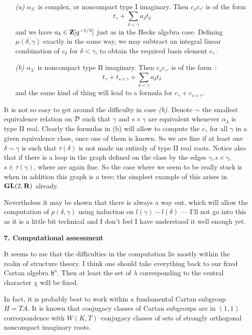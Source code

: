 \documentclass[11 pt]{article}
\def\a{\alpha}
\def\D{{\cal D}}
\def\d{\delta}
\def\GL{{\bf GL}}
\def\g{\gamma}
\def\hf{{\mathfrak h}}
\def\l{\lambda}
\def\qmh{q^{-1/2}}
\def\R{{\bf R}}
\def\Z{{\bf Z}}
\begin{document}
\begin{itemize}
\item[\it(a)]$\a_{\l'}$ is complex, or noncompact type I imaginary. Then
$c_sc_{\g'}$ is of the form
$$
t_\g+\sum_{\d<\g}a_\d t_\d
$$
and we have $a_\d\in\Z[\qmh]$ just as in the Hecke algebra case. Defining
$\mu(\d,\g)$ exactly in the same way, we may subtract an integral linear
combination of $c_\d$ for $\d<\g$, to obtain the required basis element $c_\g$.
\item[\it(b)]$\a_{\l'}$ is noncompact type II imaginary. Then $c_sc_{\g'}$ is
of the form~:
$$
t_\g+t_{s\times\g}+\sum_{\d<\g}a_\d t_\d
$$
and the same kind of thing will lead to a formula for $c_\g+c_{s\times\g}$.
\end{itemize}

It is not so easy to get around the difficulty in case {\em (b)}. Denote $\sim$
the smallest equivalence relation on $\D$ such that $\g$ and
$s\times\g$ are equivalent whenever $\a_\l$ is type II real. Clearly the
formulas in (b) will allow to compute the $c_\g$ for all $\g$ in a given
equivalence class, once one of them is known. So we are fine if at least one
$\d\sim\g$ is such that $\tau(\d)$ is not made un entirely of type II real
roots. Notice also that if there is a loop in the graph defined on the class
by the edges $\g,s\times\g$, $s\in\tau(\g)$, where are again fine. So the
case where we seem to be really stuck is when in addition this graph is a tree;
the simplest example of this arises in $\GL(2,\R)$ already.

Nevertheless it may be shown that there is always a way out, which will allow
the computation of $p(\d,\g)$ using induction on $l(\g)-l(\d)$ --- I'll not go
into this as it is a little bit technical and I don't feel I have understood
it well enough yet.

\bigskip

\noindent\textbf{7. Computational assessment}

\medskip

It seems to me that the difficulties in the computation lie mostly within
the realm of structure theory. I think one should take everything back to our
fixed Cartan algebra $\hf^a$. Then at least the set of $\l$ corresponding
to the central character $\chi$ will be fixed.

In fact, it is probably best to work within a fundamental Cartan subgroup
$H=TA$. It is known that conjugacy classes of Cartan subgroups are in
$(1,1)$ correspondence with $W(K,T)$--conjugacy classes of sets of
strongly orthogonal noncompact imaginary roots.
\end{document}
